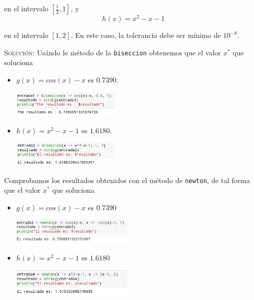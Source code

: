 \documentclass[letterpaper,11pt]{article}
\begin{document}
\begin{enumerate}
    en el intervalo $[\frac{1}{2}, 1]$, y 
    \begin{equation*}
        h(x) = x^2 - x - 1
    \end{equation*}

    en el intervalo $[1, 2]$. En este caso, la tolerancia debe ser mínimo de 
    $10^{-8}$.

    \textsc{Solución:} Usándo le método de la \texttt{biseccion} obtenemos que 
    el valor $x^*$ que soluciona 
    \begin{itemize}
        \item $g(x) = cos(x) - x$ es $0.7390$.
        \begin{center}
            \includegraphics[width=0.4\textwidth]{imagenes/biseccion_g(x).png}
        \end{center}

        \item $h(x) = x^2 - x - 1$ es $1.6180$.
        \begin{center}
            \includegraphics[width=0.4\textwidth]{imagenes/biseccion_h(x).png}
        \end{center}
    \end{itemize}

    Comprobamos los resultados obtenidos con el método de \texttt{newton}, de 
    tal forma que el valor $x^*$ que soluciona 
    \begin{itemize}
        \item $g(x) = cos(x) - x$ es $0.7390$
        \begin{center}
            \includegraphics[width=0.45\textwidth]{imagenes/newton_g(x).png}
        \end{center}

        \item $h(x) = x^2 - x - 1$ es $1.6180$
        \begin{center}
            \includegraphics[width=0.45\textwidth]{imagenes/newton_h(x).png}
        \end{center}
    \end{itemize}
    

\end{enumerate}
\end{document}
